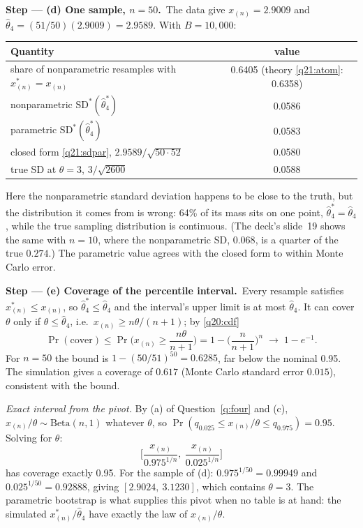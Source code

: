 \documentclass[11pt,a4paper]{article}
\numberwithin{equation}{questao}   %
\newcommand{\passo}[2]{\par\smallskip\noindent\textbf{Step --- #1.}~#2}
\begin{document}
\begin{sol}
\passo{(d) One sample, $n=50$}{The data give $x_{(n)}=2.9009$ and $\hat\theta_4=(51/50)(2.9009)=2.9589$.
With $B=10{,}000$:}
\begin{center}\small
\begin{tabular}{lc}
\toprule
Quantity & value\\
\midrule
share of nonparametric resamples with $x^*_{(n)}=x_{(n)}$ & 0.6405 \quad (theory \eqref{q21:atom}: 0.6358)\\
nonparametric $\mathrm{SD}^*(\hat\theta_4^*)$ & 0.0586\\
parametric $\mathrm{SD}^*(\hat\theta_4^*)$ & 0.0583\\
closed form \eqref{q21:sdpar}, $2.9589/\sqrt{50\cdot52}$ & 0.0580\\
true SD at $\theta=3$, $3/\sqrt{2600}$ & 0.0588\\
\bottomrule
\end{tabular}
\end{center}
Here the nonparametric standard deviation happens to be close to the truth, but the distribution it
comes from is wrong: 64\% of its mass sits on one point, $\hat\theta_4^*=\hat\theta_4$, while the true
sampling distribution is continuous. (The deck's slide~19 shows the same with $n=10$, where the
nonparametric SD, $0.068$, is a quarter of the true $0.274$.) The parametric value agrees with the
closed form to within Monte Carlo error.

\passo{(e) Coverage of the percentile interval}{Every resample satisfies $x^*_{(n)}\le x_{(n)}$, so
$\hat\theta_4^*\le\hat\theta_4$ and the interval's upper limit is at most $\hat\theta_4$. It can cover $\theta$
only if $\theta\le\hat\theta_4$, i.e.\ $x_{(n)}\ge n\theta/(n+1)$; by \eqref{q20:cdf}}
\begin{equation}\label{q21:bound}
\Pr(\text{cover})\le\Pr\Big(x_{(n)}\ge\frac{n\theta}{n+1}\Big)=1-\Big(\frac n{n+1}\Big)^n\;\to\;1-e^{-1}.
\end{equation}
For $n=50$ the bound is $1-(50/51)^{50}=0.6285$, far below the nominal 0.95. The simulation gives a
coverage of $0.617$ (Monte Carlo standard error $0.015$), consistent with the bound.

\emph{Exact interval from the pivot.} By (a) of Question~\ref{q:four} and (c), $x_{(n)}/\theta\sim
\mathrm{Beta}(n,1)$ whatever $\theta$, so $\Pr(q_{0.025}\le x_{(n)}/\theta\le q_{0.975})=0.95$. Solving for
$\theta$:
\begin{equation}\label{q21:exact}
\Big[\frac{x_{(n)}}{0.975^{1/n}},\ \frac{x_{(n)}}{0.025^{1/n}}\Big]
\end{equation}
has coverage exactly 0.95. For the sample of (d): $0.975^{1/50}=0.99949$ and $0.025^{1/50}=0.92888$,
giving $[2.9024,\ 3.1230]$, which contains $\theta=3$. The parametric bootstrap is what supplies this
pivot when no table is at hand: the simulated $x^*_{(n)}/\hat\theta_4$ have exactly the law of
$x_{(n)}/\theta$.


\end{sol}
\end{document}
